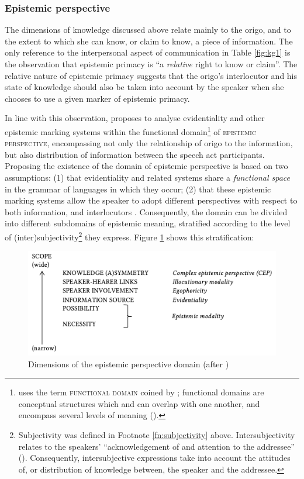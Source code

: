 \documentclass[output=paper]{langscibook}
\begin{document}
\subsubsection{Epistemic perspective}\label{s:kg1-3-3}

The dimensions of knowledge discussed above relate mainly to the origo, and to the extent to which she can know, or claim to know, a piece of information. The only reference to the interpersonal aspect of communication in Table \ref{fig:kg1} is the observation that epistemic primacy is “a \emph{relative} right to know or claim”. The relative nature of epistemic primacy suggests that the origo’s interlocutor and his state of knowledge should also be taken into account by the speaker when she chooses to use a given marker of epistemic primacy. 

In line with this observation, \cite{Bergqvist2017} proposes to analyse evidentiality and other epistemic marking systems within the functional domain\footnote{\cite{Bergqvist2017} uses the term \textsc{functional domain} coined by \cite{Givon1981}; functional domains are conceptual structures which and can overlap with one another, and encompass several levels of meaning (\citealt[11]{Bergqvist2017}).} of \textsc{epistemic perspective}, encompassing not only the relationship of origo to the information, but also distribution of information between the speech act participants. Proposing the existence of the domain of epistemic perspective is based on two assumptions: (1) that evidentiality and related systems share a \emph{functional space} in the grammar of languages in which they occur; (2) that these epistemic marking systems allow the speaker to adopt different perspectives with respect to both information, and interlocutors \citealt[11]{Bergqvist2017}. Consequently, the domain can be divided into different subdomains of epistemic meaning, stratified according to the level of (inter)subjectivity\footnote{Subjectivity was defined in Footnote \ref{fn:subjectivity} above. Intersubjectivity relates to the speakers’ “acknowledgement of and attention to the addressee” (\citealt[2]{Traugott2010}). Consequently, intersubjective expressions take into account the attitudes of, or distribution of knowledge between, the speaker and the addressee.} they express. Figure \ref{fig:kg2} shows this stratification: 

\begin{figure}[h]
	\centering
	\includegraphics[width=\linewidth]{figures/grzech-2}
	\caption{Dimensions of the epistemic perspective domain (after \citealt[12]{Bergqvist2017})}\label{fig:kg2}
\end{figure}
\end{document}
